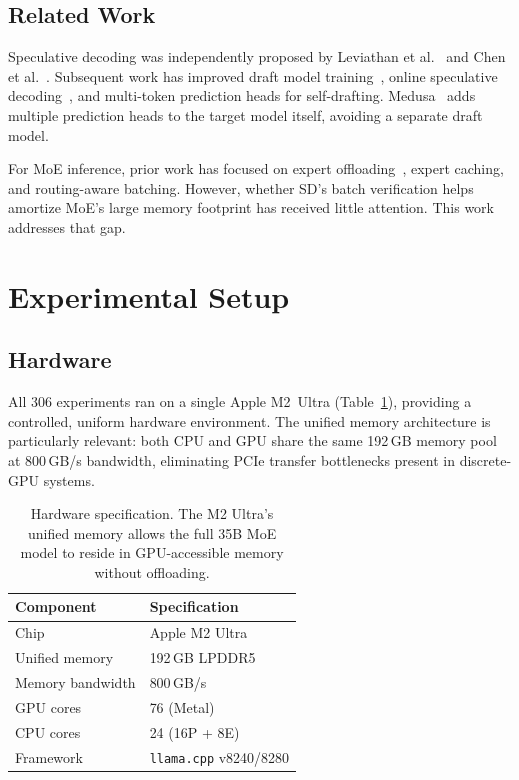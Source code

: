 \documentclass[11pt,a4paper]{article}
\begin{document}
\subsection{Related Work}

Speculative decoding was independently proposed by Leviathan et al.~\cite{leviathan2023fast} and Chen et al.~\cite{chen2023accelerating}. Subsequent work has improved draft model training~\cite{zhou2024distillspec}, online speculative decoding~\cite{liu2024online}, and multi-token prediction heads for self-drafting. Medusa~\cite{cai2024medusa} adds multiple prediction heads to the target model itself, avoiding a separate draft model.

For MoE inference, prior work has focused on expert offloading~\cite{eliseev2023fast}, expert caching, and routing-aware batching. However, whether SD's batch verification helps amortize MoE's large memory footprint has received little attention. This work addresses that gap.

\section{Experimental Setup}

\subsection{Hardware}

All 306 experiments ran on a single Apple M2~Ultra (Table~\ref{tab:hardware}), providing a controlled, uniform hardware environment. The unified memory architecture is particularly relevant: both CPU and GPU share the same 192\,GB memory pool at 800\,GB/s bandwidth, eliminating PCIe transfer bottlenecks present in discrete-GPU systems.

\begin{table}[h]
\centering
\caption{Hardware specification. The M2 Ultra's unified memory allows the full 35B MoE model to reside in GPU-accessible memory without offloading.}
\label{tab:hardware}
\begin{tabular}{@{}ll@{}}
\toprule
\textbf{Component} & \textbf{Specification} \\
\midrule
Chip & Apple M2 Ultra \\
Unified memory & 192\,GB LPDDR5 \\
Memory bandwidth & 800\,GB/s \\
GPU cores & 76 (Metal) \\
CPU cores & 24 (16P + 8E) \\
Framework & \texttt{llama.cpp} v8240/8280 \\
\bottomrule
\end{tabular}
\end{table}
\end{document}

